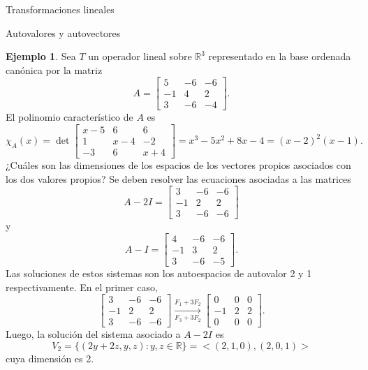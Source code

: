 \documentclass[a4paper,12pt,twoside,spanish]{amsbook}
\theoremstyle{definition}
\newtheorem{ejemplo}{Ejemplo}[section]
\theoremstyle{remark}
\newcommand{\R}{\mathbb R}
\begin{document}
\begin{chapter}{Transformaciones lineales}
\begin{section}{Autovalores y autovectores}
		\begin{ejemplo}
			Sea $T$ un operador lineal sobre $\R^3$  representado en la base ordenada canónica por la matriz
			\begin{equation*}
				A = 
				\begin{bmatrix}
				5 &-6 &-6\\ -1& 4& 2\\3 &-6& -4
				\end{bmatrix}.
			\end{equation*}
			El  polinomio característico de $A$ es
			\begin{equation*}
				\chi_A(x) = \det \begin{bmatrix}
				x-5 &6 &6\\ 1& x-4& -2\\-3 &6& x+4
				\end{bmatrix} 
				= x^3 - 5 x^2 + 8 x - 4 = (x-2)^2(x-1).
			\end{equation*}
			¿Cuáles son las dimensiones de los espacios de los vectores propios asociados
			con los dos valores propios? Se deben resolver las ecuaciones asociadas a las matrices
			\begin{equation*}
			A - 2I = 
			\begin{bmatrix}
			3 &-6 &-6\\ -1& 2& 2\\3 &-6& -6
			\end{bmatrix} 
			\end{equation*}
			y 
			\begin{equation*}
			A -I= 
			\begin{bmatrix}
			4 &-6 &-6\\ -1& 3& 2\\3 &-6& -5
			\end{bmatrix}.
			\end{equation*}
			Las soluciones de estos sistemas son los autoespacios de autovalor 2 y 1 respectivamente. En  el primer caso, 
			\begin{equation*}
			\begin{bmatrix} 3 &-6 &-6\\ -1& 2& 2\\3 &-6& -6 \end{bmatrix}
			\underset{F_3+3F_2}{\stackrel{F_1+3 F_2}{\longrightarrow}} 
			\begin{bmatrix} 0 &0 &0\\ -1& 2& 2\\0 &0& 0 \end{bmatrix}.
			\end{equation*}
			Luego,  la solución del sistema asociado a $A-2I$ es 
			$$
			V_2 = \{(2y+2z,y,z): y,z \in \R\} = <(2,1,0),(2,0,1)>
			$$
			cuya dimensión es 2. 
			

\end{ejemplo}
\end{section}
\end{chapter}
\end{document}
